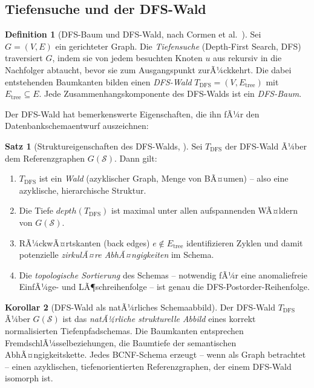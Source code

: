 ﻿\documentclass[12pt,a4paper]{article}
\theoremstyle{definition}
\newtheorem{definition}{Definition}[section]
\newtheorem{theorem}{Satz}[section]
\newtheorem{corollary}[theorem]{Korollar}
\theoremstyle{remark}
\newcommand{\depth}{\mathit{depth}}
\begin{document}
\subsection{Tiefensuche und der DFS-Wald}

\begin{definition}[DFS-Baum und DFS-Wald, nach Cormen et al.~\cite{Cormen2009}]
\label{def:dfswald}
Sei $G = (V, E)$ ein gerichteter Graph. Die \emph{Tiefensuche} (Depth-First
Search, DFS) traversiert $G$, indem sie von jedem besuchten Knoten $u$ aus
rekursiv in die Nachfolger abtaucht, bevor sie zum Ausgangspunkt zurÃ¼ckkehrt.
Die dabei entstehenden Baumkanten bilden einen \emph{DFS-Wald}
$T_{\mathrm{DFS}} = (V, E_{\mathrm{tree}})$ mit
$E_{\mathrm{tree}} \subseteq E$. Jede Zusammenhangskomponente des DFS-Walds
ist ein \emph{DFS-Baum}.
\end{definition}

Der DFS-Wald hat bemerkenswerte Eigenschaften, die ihn fÃ¼r den
Datenbankschemaentwurf auszeichnen:

\begin{theorem}[Struktureigenschaften des DFS-Walds, \cite{Cormen2009, Tarjan1972}]
\label{thm:dfswald}
Sei $T_{\mathrm{DFS}}$ der DFS-Wald Ã¼ber dem Referenzgraphen
$G(\mathcal{S})$. Dann gilt:
\begin{enumerate}[label=(\roman*)]
  \item $T_{\mathrm{DFS}}$ ist ein \emph{Wald} (azyklischer Graph, Menge
        von BÃ¤umen) -- also eine azyklische, hierarchische Struktur.
  \item Die Tiefe $\depth(T_{\mathrm{DFS}})$ ist maximal unter allen
        aufspannenden WÃ¤ldern von $G(\mathcal{S})$.
  \item RÃ¼ckwÃ¤rtskanten (back edges) $e \notin E_{\mathrm{tree}}$ identifizieren
        Zyklen und damit potenzielle \emph{zirkulÃ¤re AbhÃ¤ngigkeiten} im Schema.
  \item Die \emph{topologische Sortierung} des Schemas -- notwendig fÃ¼r
        eine anomaliefreie EinfÃ¼ge- und LÃ¶schreihenfolge -- ist
        genau die DFS-Postorder-Reihenfolge.
\end{enumerate}
\end{theorem}

\begin{corollary}[DFS-Wald als natÃ¼rliches Schemaabbild]
Der DFS-Wald $T_{\mathrm{DFS}}$ Ã¼ber $G(\mathcal{S})$ ist das
\emph{natÃ¼rliche strukturelle Abbild} eines korrekt normalisierten
Tiefenpfadschemas. Die Baumkanten entsprechen FremdschlÃ¼sselbeziehungen,
die Baumtiefe der semantischen AbhÃ¤ngigkeitskette.
Jedes BCNF-Schema erzeugt -- wenn als Graph betrachtet -- einen azyklischen,
tiefenorientierten Referenzgraphen, der einem DFS-Wald isomorph ist.
\end{corollary}
\end{document}
